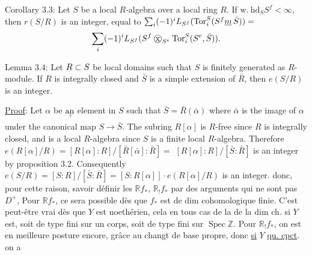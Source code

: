 Corollary 3.3: Let $S$ be a local $R$-algebra over a local ring $R$. If
$\mathrm{w.}\ \mathrm{hd}_S S^f<\infty$, then $r(S/R)$ is an integer, equal to $\sum_i(-1)^i L_{S^f}(\operatorname{Tor}_i^S(S^f\underline m\,\bar S))=$
\[
\handwritten{\sum}_i(-1)^i L_{S^f}(S^f\mathbin{\ooalign{\hfil$\mathrm{x}$\hfil\cr\hfil$\handwritten{\bigcirc}$\hfil\cr}}_{S^e}\operatorname{Tor}_i^S(S^e,\bar S)).
\]

Lemma 3.4: Let $R\subset S$ be local domains such that $S$ is finitely
generated as $R$-module. If $R$ is integrally closed and $\bar S$ is a simple
extension of $\bar R$, then $e(S/R)$ is an integer.

\uline{Proof}: Let $\alpha$ be $\underset{\unsure{:}}{\text{an}}$ element in $S$ such that $\bar S=\bar R(\bar\alpha)$ where $\bar\alpha$ is the
image of $\alpha$ under the canonical map $S\longrightarrow\bar S$. The subring $R[\alpha]$ is $R$-free
since $R$ is integrally closed, and is a local $R$-algebra since $S$ is a finite
local $R$-algebra. Therefore $e(R[\alpha]/R)=[R[\alpha]:R]/[\bar R[\bar\alpha]:\bar R]=$
$[R[\alpha]:R]/[\bar S:\bar R]$ is an integer by proposition 3.2. Consequently
$e(S/R)=[S:R]/[\bar S:\bar R]=[S:R[\alpha]]\cdot e(R[\alpha]/R)$ is an integer.
donc, pour cette raison, savoir définir les $\mathbb R f_*$, $\mathbb R_! f_*$ par des arguments qui ne sont pas  $D^+$,  Pour $\mathbb R f_*$, ce sera possible dès que $f_*$ est de dim cohomologique finie. C'est peut-être vrai dès que $Y$ est noethérien, cela   en tous cas de la  de la dim ch. si $Y$ est,  soit de type fini sur un corps, soit de type fini sur $\operatorname{Spec}\mathbb Z$. Pour $\mathbb R_! f_*$, on est en meilleure posture encore, grâce au changt de base propre, donc \uline{si} $Y$ \uline{qu. cpct}. on a

